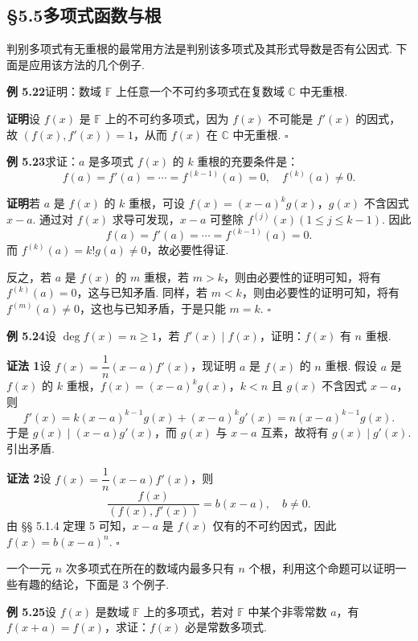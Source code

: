 \documentclass[UTF8,12pt,a4paper,fontset=fandol]{ctexart}
\begin{document}
\subsection*{§5.5\quad 多项式函数与根}

判别多项式有无重根的最常用方法是判别该多项式及其形式导数是否有公因式. 下面是应用该方法的几个例子.

\noindent\textbf{例 5.22}\quad 证明：数域 $\mathbb{F}$ 上任意一个不可约多项式在复数域 $\mathbb{C}$ 中无重根.

\noindent\textbf{证明}\quad 设 $f(x)$ 是 $\mathbb{F}$ 上的不可约多项式，因为 $f(x)$ 不可能是 $f'(x)$ 的因式，故 $(f(x),f'(x))=1$，从而 $f(x)$ 在 $\mathbb{C}$ 中无重根. \hfill $\square$

\noindent\textbf{例 5.23}\quad 求证：$a$ 是多项式 $f(x)$ 的 $k$ 重根的充要条件是：
\[
f(a)=f'(a)=\cdots=f^{(k-1)}(a)=0,\quad f^{(k)}(a)\ne0.
\]

\noindent\textbf{证明}\quad 若 $a$ 是 $f(x)$ 的 $k$ 重根，可设 $f(x)=(x-a)^kg(x)$，$g(x)$ 不含因式 $x-a$. 通过对 $f(x)$ 求导可发现，$x-a$ 可整除 $f^{(j)}(x)(1\le j\le k-1)$. 因此
\[
f(a)=f'(a)=\cdots=f^{(k-1)}(a)=0.
\]
而 $f^{(k)}(a)=k!g(a)\ne0$，故必要性得证.

反之，若 $a$ 是 $f(x)$ 的 $m$ 重根，若 $m>k$，则由必要性的证明可知，将有 $f^{(k)}(a)=0$，这与已知矛盾. 同样，若 $m<k$，则由必要性的证明可知，将有 $f^{(m)}(a)\ne0$，这也与已知矛盾，于是只能 $m=k$. \hfill $\square$

\noindent\textbf{例 5.24}\quad 设 $\deg f(x)=n\ge1$，若 $f'(x)\mid f(x)$，证明：$f(x)$ 有 $n$ 重根.

\noindent\textbf{证法 1}\quad 设 $f(x)=\dfrac1n(x-a)f'(x)$，现证明 $a$ 是 $f(x)$ 的 $n$ 重根. 假设 $a$ 是 $f(x)$ 的 $k$ 重根，$f(x)=(x-a)^kg(x)$，$k<n$ 且 $g(x)$ 不含因式 $x-a$，则
\[
f'(x)=k(x-a)^{k-1}g(x)+(x-a)^kg'(x)=n(x-a)^{k-1}g(x).
\]
于是 $g(x)\mid (x-a)g'(x)$，而 $g(x)$ 与 $x-a$ 互素，故将有 $g(x)\mid g'(x)$. 引出矛盾.

\noindent\textbf{证法 2}\quad 设 $f(x)=\dfrac1n(x-a)f'(x)$，则
\[
\frac{f(x)}{(f(x),f'(x))}=b(x-a),\quad b\ne0.
\]
由 §§ 5.1.4 定理 5 可知，$x-a$ 是 $f(x)$ 仅有的不可约因式，因此 $f(x)=b(x-a)^n$. \hfill $\square$

一个一元 $n$ 次多项式在所在的数域内最多只有 $n$ 个根，利用这个命题可以证明一些有趣的结论，下面是 3 个例子.

\noindent\textbf{例 5.25}\quad 设 $f(x)$ 是数域 $\mathbb{F}$ 上的多项式，若对 $\mathbb{F}$ 中某个非零常数 $a$，有 $f(x+a)=f(x)$，求证：$f(x)$ 必是常数多项式.
\end{document}
